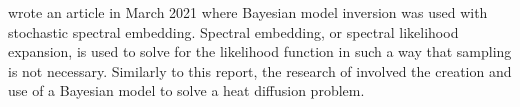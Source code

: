 
\citeauthor{Wagner:2021} wrote an article in March 2021 where Bayesian model inversion was used with stochastic spectral embedding.
Spectral embedding, or spectral likelihood expansion, is used to solve for the likelihood function in such a way that sampling is not necessary.
Similarly to this report, the research of \citeauthor{Wagner:2021} involved the creation and use of a Bayesian model to solve a heat diffusion problem.

